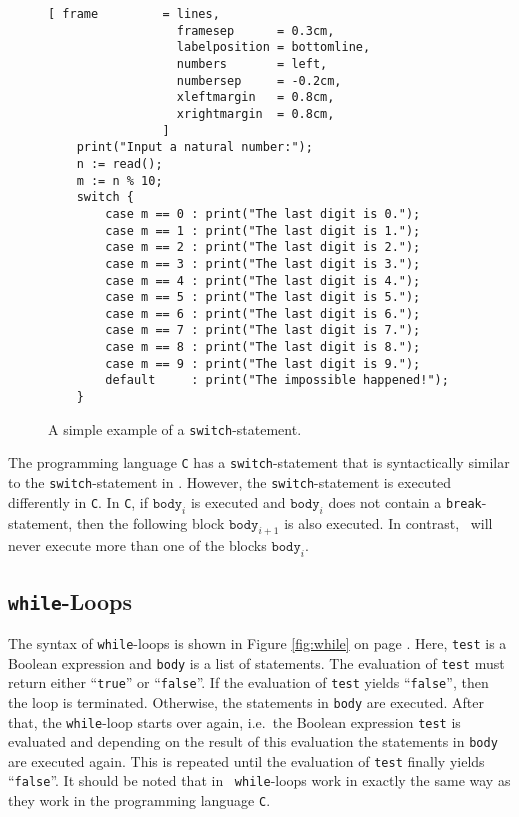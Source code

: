 \begin{figure}[!ht]
\centering
\begin{Verbatim}[ frame         = lines, 
                  framesep      = 0.3cm, 
                  labelposition = bottomline,
                  numbers       = left,
                  numbersep     = -0.2cm,
                  xleftmargin   = 0.8cm,
                  xrightmargin  = 0.8cm,
                ]
    print("Input a natural number:");
    n := read();
    m := n % 10;
    switch {
        case m == 0 : print("The last digit is 0.");
        case m == 1 : print("The last digit is 1.");
        case m == 2 : print("The last digit is 2.");
        case m == 3 : print("The last digit is 3.");
        case m == 4 : print("The last digit is 4.");
        case m == 5 : print("The last digit is 5.");
        case m == 6 : print("The last digit is 6.");
        case m == 7 : print("The last digit is 7.");
        case m == 8 : print("The last digit is 8.");
        case m == 9 : print("The last digit is 9.");
        default     : print("The impossible happened!");
    }
\end{Verbatim}
\vspace*{-0.3cm}
\caption{A simple example of a \texttt{switch}-statement.}
\label{fig:switch.stlx}
\end{figure}
\remarkEng
The programming language \texttt{C} has a \texttt{switch}-statement that is syntactically similar to the
\texttt{switch}-statement in \setlx.  However, the \texttt{switch}-statement is executed
\colorbox{amethyst}{differently} in \texttt{C}.  In \texttt{C}, if $\texttt{body}_i$ is executed and $\texttt{body}_i$ does not contain a
\texttt{break}-statement, then the following block $\texttt{body}_{i+1}$ is also executed.  In contrast,
\setlx\ will \colorbox{amethyst}{never} execute more than one of the blocks $\texttt{body}_i$.
\pagebreak

\subsection{\texttt{while}-Loops}
The syntax of  \texttt{while}-loops is shown in Figure \ref{fig:while} on page
\pageref{fig:while}.  Here,  \texttt{test} is a Boolean expression and \texttt{body} is a list of statements.  
The evaluation of \texttt{test} must
return either  ``\texttt{true}'' or ``\texttt{false}''.
If the evaluation of \texttt{test} yields  ``\texttt{false}'', then the loop is terminated.
Otherwise, the statements in \texttt{body} are executed.  After that, the \texttt{while}-loop starts over
again, i.e.~the Boolean expression \texttt{test} is evaluated and depending on the result of this evaluation
the statements in  \texttt{body} are executed again.  This is repeated until the evaluation of  \texttt{test}
finally yields  ``\texttt{false}''.  It should be noted that in \setlx\ \texttt{while}-loops work in exactly
the same way as they work in the programming language \texttt{C}.

